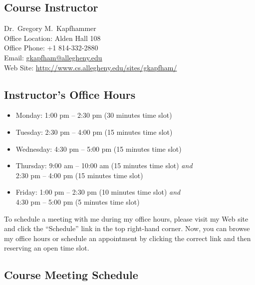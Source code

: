 

\usepackage[compact]{titlesec}



\subsection*{Course Instructor}
Dr.\ Gregory M.\ Kapfhammer\\
\noindent Office Location: Alden Hall 108 \\
\noindent Office Phone: +1 814-332-2880 \\
\noindent Email: \url{gkapfham@allegheny.edu} \\
\noindent Web Site: \url{http://www.cs.allegheny.edu/sites/gkapfham/}

\subsection*{Instructor's Office Hours}

\begin{itemize}
	\itemsep 0em
	\item Monday: 1:00 pm -- 2:30 pm (30 minutes time slot)
	\item Tuesday: 2:30 pm -- 4:00 pm (15 minutes time slot)
	\item Wednesday: 4:30 pm -- 5:00 pm (15 minutes time slot)
	\item Thursday: 9:00 am -- 10:00 am (15 minutes time slot) {\em and} \\ \hspace*{.69in} 2:30 pm -- 4:00 pm (15 minutes time slot)
	\item Friday: 1:00 pm -- 2:30 pm (10 minutes time slot) {\em and} \\ \hspace*{.49in} 4:30 pm -- 5:00 pm (5 minutes time slot)
\end{itemize}

\noindent
To schedule a meeting with me during my office hours, please visit my Web site and click the ``Schedule'' link in the
top right-hand corner. Now, you can browse my office hours or schedule an appointment by clicking the correct link and
then reserving an open time slot. 

\subsection*{Course Meeting Schedule}

